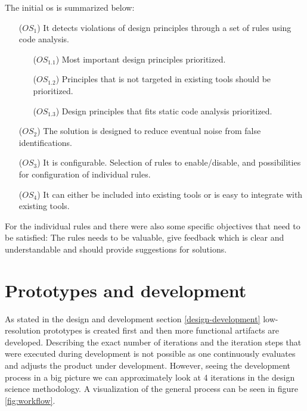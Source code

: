 \documentclass[pdftex,10pt,b5paper,twoside]{report}
\begin{document}
The initial \gls{os} is summarized below:
\begin{itemize}
    \item [(\(OS_{1}\))] It detects violations of design principles through a set of rules using code analysis.
    \begin{itemize}
        
        \item [(\(OS_{1.1}\))] Most important design principles prioritized.
        
        \item [(\(OS_{1.2}\))] Principles that is not targeted in existing tools should be prioritized.
        
        \item [(\(OS_{1.3}\))] Design principles that fits static code analysis prioritized.
    \end{itemize}
    \item [(\(OS_{2}\))] The solution is designed to reduce eventual noise from false identifications. 
    
    \item [(\(OS_{3}\))] It is configurable. Selection of rules to enable/disable, and possibilities for configuration of individual rules.  
    
    \item [(\(OS_{4}\))] It can either be included into existing tools or is easy to integrate with existing tools.
\end{itemize}

For the individual rules and there were also some specific objectives that need to be satisfied: The rules needs to be valuable, give feedback which is clear and understandable and should provide suggestions for solutions.

\section{Prototypes and development}
\label{on-prototypes}
As stated in the design and development section \ref{design-development} low-resolution 
prototypes is created first and then more functional artifacts are developed. Describing the exact number of iterations and the iteration steps that were executed during development is not possible as one continuously evaluates and adjusts the product under development. However, seeing the development process in a big picture we can approximately look at 4 iterations in the design science methodology. A visualization of the general process can be seen in figure \ref{fig:workflow}.
\end{document}

